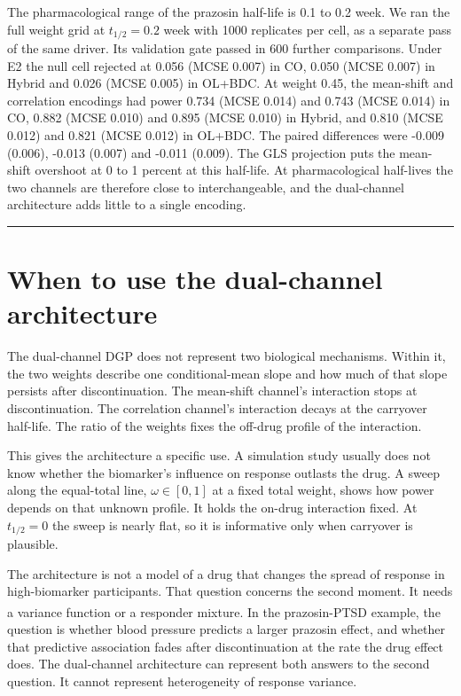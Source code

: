 \documentclass[
  11pt,
]{article}
\begin{document}
The pharmacological range of the prazosin half-life is 0.1 to 0.2 week. We ran the full weight grid at \(t_{1/2} = 0.2\) week with 1000 replicates per cell, as a separate pass of the same driver. Its validation gate passed in 600 further comparisons. Under E2 the null cell rejected at 0.056 (MCSE 0.007) in CO, 0.050 (MCSE 0.007) in Hybrid and 0.026 (MCSE 0.005) in OL+BDC. At weight 0.45, the mean-shift and correlation encodings had power 0.734 (MCSE 0.014) and 0.743 (MCSE 0.014) in CO, 0.882 (MCSE 0.010) and 0.895 (MCSE 0.010) in Hybrid, and 0.810 (MCSE 0.012) and 0.821 (MCSE 0.012) in OL+BDC. The paired differences were -0.009 (0.006), -0.013 (0.007) and -0.011 (0.009). The GLS projection puts the mean-shift overshoot at 0 to 1 percent at this half-life. At pharmacological half-lives the two channels are therefore close to interchangeable, and the dual-channel architecture adds little to a single encoding.

\bigskip\noindent

\rule{\textwidth}{0.4pt}\bigskip

\section{When to use the dual-channel architecture}\label{when-to-use-the-dual-channel-architecture}

The dual-channel DGP does not represent two biological mechanisms.
Within it, the two weights describe one conditional-mean slope and
how much of that slope persists after discontinuation. The mean-shift
channel's interaction stops at discontinuation. The correlation
channel's interaction decays at the carryover half-life. The ratio of
the weights fixes the off-drug profile of the interaction.

This gives the architecture a specific use. A simulation study
usually does not know whether the biomarker's influence on response
outlasts the drug. A sweep along the equal-total line,
\(\omega \in [0, 1]\) at a fixed total weight, shows how power depends
on that unknown profile. It holds the on-drug interaction fixed. At
\(t_{1/2} = 0\) the sweep is nearly flat, so it is informative only when
carryover is plausible.

The architecture is not a model of a drug that changes the spread of
response in high-biomarker participants. That question concerns the
second moment. It needs a variance function\textsuperscript{} or a
responder mixture\textsuperscript{}. In the prazosin-PTSD example,
the question is whether blood pressure predicts a larger prazosin
effect, and whether that predictive association fades after
discontinuation at the rate the drug effect does. The dual-channel
architecture can represent both answers to the second question. It
cannot represent heterogeneity of response variance.
\end{document}

